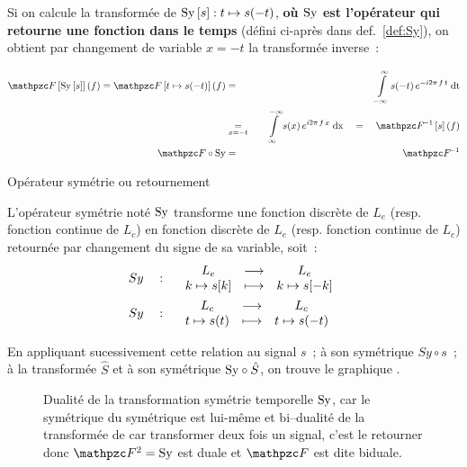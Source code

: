 Si on calcule la transformée de $\mathrm{Sy}\left[s\right] : t\mapsto s(-t)$,
\textbf{où $\mathrm{Sy}{}$ est l'opérateur qui retourne une fonction dans le
  temps} (défini ci-après dans def.~\ref{def:Sy}), on obtient par
changement de variable $x=-t$ la transformée inverse~:

\begin{eqnarray}
  \label{eq:Transformee_de_Sy}
  \F\b{\Sy\b{s}}(f)=\F\b{t\mapsto s(-t)}(f)&=&\quad\intDt{-\infty}{\infty}{s(-t)\,e^{-i2\pi\,f\,t}} \nonumber\\
                                           & \underset{x=-t}{=}& \quad\intDx{\infty}{-\infty}{s(x)\,e^{i2\pi\,f\,x}}\quad =\quad \Finv\b{s}(f) \nonumber\\
  \F\circ\Sy &=& \quad \Finv
\end{eqnarray}

\begin{definition}{Opérateur symétrie ou \og{} retournement \fg{}}
  \label{def:Sy}
  
  L'opérateur symétrie noté $\mathrm{Sy}$ transforme une fonction discrète de
  $L_e$ (resp. fonction continue de $L_c$) en fonction discrète de
  $L_e$ (resp. fonction continue de $L_c$) retournée par changement du
  signe de sa variable, soit~:
  \begin{align}
    \label{eq:Sy}
    &Sy\quad:\quad\begin{array}{ccc} L_e & \longrightarrow & L_e \\ k \mapsto s\!\left[k\right] & \longmapsto & k \mapsto s\!\left[-k\right] \\ \end{array}\\
    &Sy\quad:\quad\begin{array}{ccc} L_c & \longrightarrow & L_c \\ t \mapsto s\!\left(t\right) & \longmapsto & t \mapsto s\!\left(-t\right) \\ \end{array}\nonumber
  \end{align}
\end{definition}

En appliquant sucessivement cette relation au signal $s$~; à son
symétrique $Sy\circ s$~; à la transformée $\hat{S}$ et à son
symétrique $\mathrm{Sy}\circ\hat{S}$, on trouve le graphique
.
\begin{figure}[ht!]
  \centering {}
  \caption{Dualité de la transformation symétrie temporelle $\mathrm{Sy}$, car
    le symétrique du symétrique est lui-même et bi--dualité de la
    transformée de \Fourier{} car transformer deux fois un signal, c'est 
    le retourner donc $\F{}^2=\Sy{}$ est duale et $\F{}$ est
    dite biduale.}
  \label{fig:dualite_4_f}
\end{figure}

